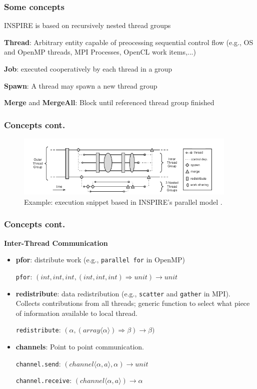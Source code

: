 \documentclass{beamer}
\newcommand\fB[1]{\textcolor{blue!80!black}{\textbf{#1}}}
\begin{document}
\begin{frame}
\frametitle{Some concepts}
INSPIRE is based on recursively nested thread groups

\bigskip
\fB{Thread}: Arbitrary entity capable of preocessing sequential control flow (e.g., OS and OpenMP threads, MPI Processes, OpenCL work items,...)

\bigskip
\fB{Job}: executed cooperatively by each thread in a group

\bigskip
\fB{Spawn}: A thread may spawn a new thread group

\bigskip
\fB{Merge} and \fB{MergeAll}: Block until referenced thread group finished 
\end{frame}

\begin{frame}
\frametitle{Concepts cont.}

\begin{figure}
\centering
\includegraphics[width=300pt]{sampleExec}
\caption{Example: execution snippet based in INSPIRE's parallel model \cite{JordanPTKF13}.}
\end{figure}

\end{frame}

\begin{frame}
\frametitle{Concepts cont.}
\fB{Inter-Thread Communication}
\begin{itemize}
\item \fB{pfor}: distribute work (e.g., \texttt{parallel for} in OpenMP)

\texttt{pfor}: $(int,int,int,(int,int,int) \Rightarrow unit) \rightarrow unit $  

\bigskip\pause
\item \fB{redistribute}: data redistribution (e.g., \texttt{scatter} and \texttt{gather} in MPI). Collects contributions from all threads; generic function to select what piece of information available to local thread.

\texttt{redistribute}: $(\alpha, (array \langle\alpha\rangle) \Rightarrow \beta) \rightarrow \beta)$

\bigskip\pause
\item \fB{channels}: Point to point communication.

\texttt{channel.send}: $(channel\langle\alpha , a\rangle, \alpha) \rightarrow unit$

\texttt{channel.receive}: $(channel\langle\alpha, a\rangle) \rightarrow \alpha $

\end{itemize}

\end{frame}
\end{document}
